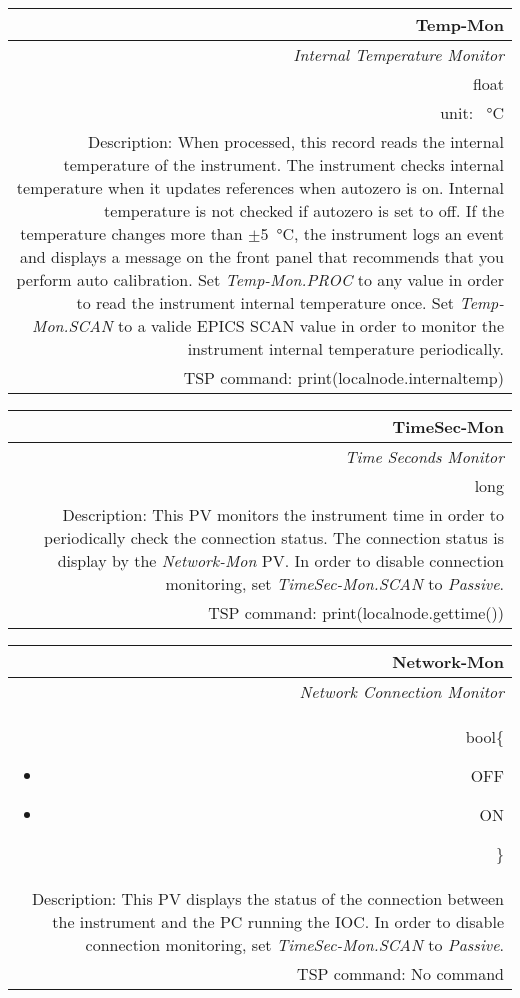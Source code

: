 \documentclass[openany]{article}
\begin{document}
		\begin{tabular}{N}
			\hline
			\bfseries Temp-Mon\label{pv:temp-mon} \\ \hline
			\emph{Internal Temperature Monitor} \\
			float \\
			unit: \SI{}{\degreeCelsius} \\
			Description: When processed, this record reads the internal temperature of the instrument. The instrument checks internal temperature when it updates references when autozero is on. Internal temperature is not checked if autozero is set to off. If the temperature changes more than $\pm$\SI{5}{\degreeCelsius}, the instrument logs an event and displays a message on the front panel that recommends that you perform auto calibration. Set \emph{Temp-Mon.PROC} to any value in order to read the instrument internal temperature once. Set \emph{Temp-Mon.SCAN} to a valide EPICS SCAN value in order to monitor the instrument internal temperature periodically. \\
			TSP command: print(localnode.internaltemp)
		\end{tabular}

		\begin{tabular}{N}
			\hline
			\bfseries TimeSec-Mon\label{pv:timesec-mon} \\ \hline
			\emph{Time Seconds Monitor} \\
			long \\
			Description: This PV monitors the instrument time in order to periodically check the connection status. The connection status is display by the \emph{Network-Mon} PV. In order to disable connection monitoring, set \emph{TimeSec-Mon.SCAN} to \emph{Passive}. \\
			TSP command: print(localnode.gettime())
		\end{tabular}

		\begin{tabular}{N}
			\hline
			\bfseries Network-Mon\label{pv:network-mon} \\ \hline
			\emph{Network Connection Monitor} \\
			bool\{\begin{itemize}[noitemsep]
				\small
				\item[] OFF
				\item[] ON
			\end{itemize}\} \\
			Description: This PV displays the status of the connection between the instrument and the PC running the IOC. In order to disable connection monitoring, set \emph{TimeSec-Mon.SCAN} to \emph{Passive}. \\
			TSP command: No command
		\end{tabular}
\end{document}

